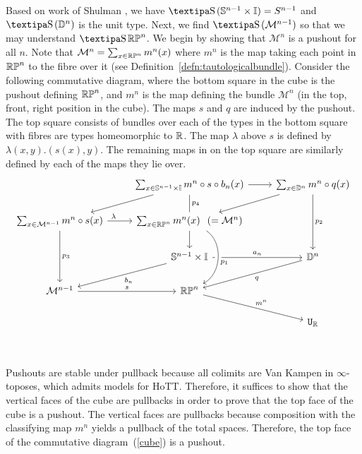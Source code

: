 \documentclass{amsart}
\begin{document}
Based on work of Shulman \cite{shul:bfp}, we have $\shape(\set{S}^{n-1} \times \set{I}) =S^{n-1}$ and $\shape (\set{D}^{n})$ is the unit type. Next, we find $\shape (\mathcal{M}^{n-1})$ so that we may understand $ \shape \set{RP}^n$.  We begin by showing that $\mathcal{M}^{n}$ is a pushout for all $n$. Note that $\mathcal{M}^n= \sum _{x \in \mathbb{RP}^n} m^n (x)$ where $m^n$ is the map taking each point in $\mathbb{RP}^n$ to the fibre over it (see Definition~\ref{defn:tautologicalbundle}). Consider the following commutative diagram, where the bottom square in the cube is the pushout defining $\mathbb{RP}^n$, and $m^n$ is the map defining the bundle  $ \mathcal{M}^{n}$ (in the top, front, right position in the cube). The maps $s$ and $q$ are induced by the pushout. The top square consists of bundles over each of the types in the bottom square with fibres are types homeomorphic to $\mathbb{R}$. The map $\lambda$ above $s$ is defined by $\lambda (x,y). (s(x),y)$. The remaining maps in on the top square are similarly defined by each of the maps they lie over. \\
\begin{equation}
\begin{tikzcd}
																				& \sum_{x \in \set{S}^{n-1} \times \set{I}} m^n \circ s \circ b_n (x) \arrow[r]	\arrow[ld] \arrow[-, d, "p_4"] 	& \sum_{x \in \set{D}^n} m^n \circ q (x) \arrow[ld] \arrow[dd, "p_2"]\\
\sum_{x \in \mathcal{M}^{n-1}}  m^n \circ s (x) \arrow[r, crossing over, near start, "\lambda"] \arrow[dd, "p_3"]	& \sum_{x \in \set{RP}^n}m^n(x)\hspace{0.25cm} (=\mathcal{M}^n)	\arrow[d]								&	\\
																				& \set{S}^{n-1} \times \set{I} \arrow[r, "a_n"] \arrow[ld, "b_n"]										& \set{D}^n \arrow [ld, "q"]\\
\mathcal{M}^{n-1} \arrow[r, "s" ]															& \set{RP}^n \ar[rd, "m^n"] 																	& \\
																				&																						& \U_{\set{R}}\\
\arrow[from=2-2, to=4-2, crossing over, bend left = 60, "p_1"]
\end{tikzcd}
\label{cube}
\end{equation}

Pushouts are stable under pullback because all colimits are Van Kampen in $\infty$-toposes, which admits models for HoTT. Therefore, it suffices to show that the vertical faces of the cube are pullbacks in order to prove that the top face of the cube is a pushout. The vertical faces are pullbacks because composition with the classifying map $m^n$ yields a pullback of the total spaces. Therefore, the top face of the commutative diagram~(\ref{cube}) is a pushout.
\end{document}

